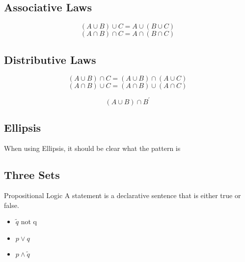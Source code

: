 \subsection*{Associative Laws}
\[ (A \cup B) \cup C =  A \cup (B \cup C)  \]
\[ (A \cap B) \cap C =  A \cap (B \cap C)  \]

\subsection*{Distributive Laws}
\[ (A \cup B) \cap C =  (A \cup B) \cap (A \cup C)  \]
\[ (A \cap B) \cup C =  (A \cap B) \cup (A \cap C)  \]


\[ (A \cup B) \cap B^{\prime} \]

\newpage






\subsection{Ellipsis}

When using Ellipsis, it should be clear what the pattern is



\subsection*{ Three Sets }


Propositional Logic A statement is a declarative sentence that
is either true or false.
\begin{itemize}
\item $\tilde q$ not q \item $p \vee q$ \item $p \wedge \tilde
q$
\end{itemize}




